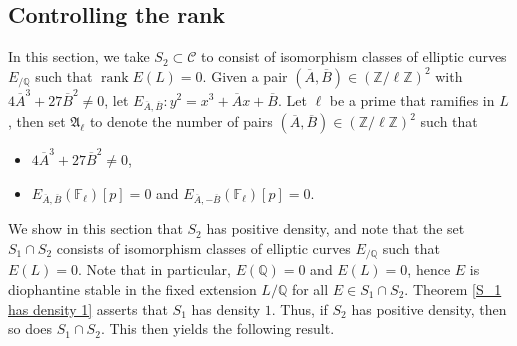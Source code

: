 \documentclass[12pt]{amsart}
\newcommand{\Z}{\mathbb{Z}}
\newcommand{\Q}{\mathbb{Q}}
\newcommand{\F}{\mathbb{F}}
\newcommand{\cC}{\mathcal{C}}
\newcommand{\op}[1]{\operatorname{#1}}
\numberwithin{equation}{section}
\begin{document}
\subsection{Controlling the rank}
\par In this section, we take $S_2\subset \cC$ to consist of isomorphism classes of elliptic curves $E_{/\Q}$ such that $\op{rank}E(L)=0$. Given a pair $(\overline{A}, \overline{B})\in (\Z/\ell\Z)^2$ with $4 \overline{A}^3+27 \overline{B}^2\neq 0$, let 
$E_{\overline{A}, \overline{B}}:y^2=x^3+\overline{A}x+\overline{B}$. Let $\ell$ be a prime that ramifies in $L$, then set $\mathfrak{A}_\ell$ to denote the number of pairs $(\overline{A}, \overline{B})\in (\Z/\ell\Z)^2$ such that
\begin{itemize}
\item $4 \overline{A}^3+27 \overline{B}^2\neq 0$, 
\item $E_{\overline{A}, \overline{B}}(\F_\ell)[p]=0$ and $E_{\overline{A}, -\overline{B}}(\F_\ell)[p]=0$.
\end{itemize}
We show in this section that $S_2$ has positive density, and note that the set $S_1\cap  S_2$ consists of isomorphism classes of elliptic curves $E_{/\Q}$ such that $E(L)=0$. Note that in particular, $E(\Q)=0$ and $E(L)=0$, hence $E$ is diophantine stable in the fixed extension $L/\Q$ for all $E\in S_1\cap S_2$. Theorem \ref{S_1 has density 1} asserts that $S_1$ has density $1$. Thus, if $S_2$ has positive density, then so does $S_1\cap S_2$. This then yields the following result. 
\end{document}
